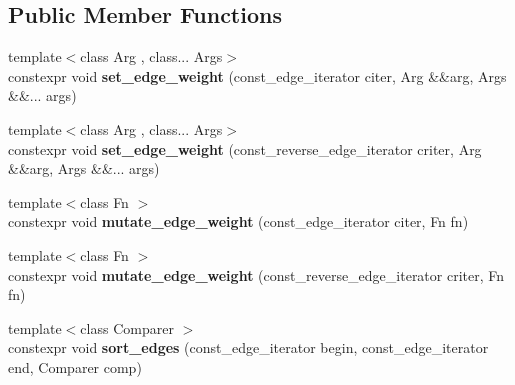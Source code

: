 \subsection*{Public Member Functions}
\begin{DoxyCompactItemize}
\item 
\mbox{\label{classsequoia_1_1maths_1_1heterogeneous__static__graph_ac0e792491e081f8c8ba162843e051819}} 
{\footnotesize template$<$class Arg , class... Args$>$ }\\constexpr void {\bfseries set\+\_\+edge\+\_\+weight} (const\+\_\+edge\+\_\+iterator citer, Arg \&\&arg, Args \&\&... args)
\item 
\mbox{\label{classsequoia_1_1maths_1_1heterogeneous__static__graph_a3f16c0921d7fd0d218c36dcd01f1267c}} 
{\footnotesize template$<$class Arg , class... Args$>$ }\\constexpr void {\bfseries set\+\_\+edge\+\_\+weight} (const\+\_\+reverse\+\_\+edge\+\_\+iterator criter, Arg \&\&arg, Args \&\&... args)
\item 
\mbox{\label{classsequoia_1_1maths_1_1heterogeneous__static__graph_abf85f31fdce6725b520b327aade04b8c}} 
{\footnotesize template$<$class Fn $>$ }\\constexpr void {\bfseries mutate\+\_\+edge\+\_\+weight} (const\+\_\+edge\+\_\+iterator citer, Fn fn)
\item 
\mbox{\label{classsequoia_1_1maths_1_1heterogeneous__static__graph_addb1de80af85f13d4c81aa8061741b46}} 
{\footnotesize template$<$class Fn $>$ }\\constexpr void {\bfseries mutate\+\_\+edge\+\_\+weight} (const\+\_\+reverse\+\_\+edge\+\_\+iterator criter, Fn fn)
\item 
\mbox{\label{classsequoia_1_1maths_1_1heterogeneous__static__graph_abd685fa53183f904e92e1a6b5f6234b2}} 
{\footnotesize template$<$class Comparer $>$ }\\constexpr void {\bfseries sort\+\_\+edges} (const\+\_\+edge\+\_\+iterator begin, const\+\_\+edge\+\_\+iterator end, Comparer comp)
\end{DoxyCompactItemize}
